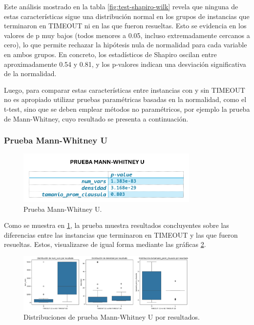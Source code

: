 Este an\'alisis mostrado en la tabla \ref{fig:test-shapiro-wilk} revela que ninguna de estas características sigue una distribución normal en los grupos de instancias que terminaron en TIMEOUT ni en las que fueron resueltas. Esto se evidencia en los valores de p muy bajos (todos menores a 0.05, incluso extremadamente cercanos a cero), lo que permite rechazar la hipótesis nula de normalidad para cada variable en ambos grupos. En concreto, los estadísticos de Shapiro oscilan entre aproximadamente 0.54 y 0.81, y los p-valores indican una desviación significativa de la normalidad.

Luego, para comparar estas características entre instancias con y sin TIMEOUT no es apropiado utilizar pruebas paramétricas basadas en la normalidad, como el t-test, sino que se deben emplear métodos no paramétricos, por ejemplo la prueba de Mann-Whitney, cuyo resultado se presenta a continuaci\'on. 

\subsubsection{Prueba Mann-Whitney U}

\begin{figure}[ht]
    \centering
    \includegraphics[width=0.8\textwidth]{Graphics/prueba_mann_whitney_u.png}
    \caption{Prueba Mann-Whitney U.}
    \label{fig:prueba-mann-whitney-u}
\end{figure}

Como se muestra en \ref{fig:prueba-mann-whitney-u}, la prueba muestra resultados concluyentes sobre las diferencias entre las instancias que terminaron en TIMEOUT y las que fueron resueltas. Estos, visualizarse de igual forma mediante las gr\'aficas \ref{fig:dist-man-whitney}.


\begin{figure}[ht]
    \centering
    \includegraphics[width=0.8\textwidth]{Graphics/man_whitney.png}
    \caption{Distribuciones de prueba Mann-Whitney U por resultados.}
    \label{fig:dist-man-whitney}
\end{figure}

